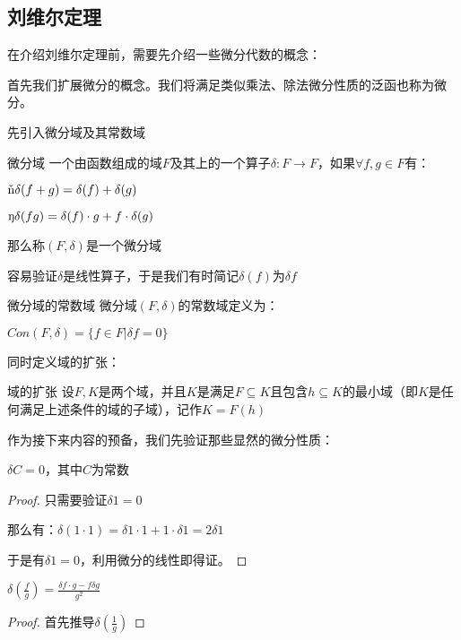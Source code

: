 \documentclass[12pt, a4paper, oneside, UTF8]{ctexbook}
\begin{document}
		\subsection{刘维尔定理}
			在介绍刘维尔定理前，需要先介绍一些微分代数的概念：
			
			首先我们扩展微分的概念。我们将满足类似乘法、除法微分性质的泛函也称为微分。
			
			先引入微分域及其常数域
			\begin{para}{0}
					\begin{defn}{微分域}{}
						一个由函数组成的域$F$及其上的一个算子$\delta:F \rightarrow F$，如果$\forall f,g \in F$有：
						
						$\ding{172} \delta(f+g) = \delta(f)+\delta(g)$
						
						$\ding{173} \delta(fg) = \delta(f)\cdot g+f \cdot \delta(g)$
						
						那么称$(F,\delta)$是一个微分域
					\end{defn}
					容易验证$\delta$是线性算子，于是我们有时简记$\delta(f)$为$\delta f$
					\begin{defn}{微分域的常数域}{}
						微分域$(F,\delta)$的常数域定义为：
						
						$Con (F,\delta) =\{f \in F| \delta f = 0\}$
					\end{defn}
					同时定义域的扩张：
					\begin{defn}{域的扩张}{}
						设$F,K$是两个域，并且$K$是满足$F \subseteq K$且包含$h \subseteq K$的最小域（即$K$是任何满足上述条件的域的子域），记作$K = F(h)$
					\end{defn}
					作为接下来内容的预备，我们先验证那些显然的微分性质：
					\begin{proposition}
						$\delta C = 0$，其中$C$为常数 
					\end{proposition}
					\begin{proof}
						只需要验证$\delta 1 = 0$
						
						那么有：$\delta (1\cdot 1) = \delta 1 \cdot 1 + 1 \cdot \delta 1=2\delta 1$
						
						于是有$\delta 1 = 0$，利用微分的线性即得证。
					\end{proof}
					\begin{proposition}
						$\delta \left(\frac{f}{g}\right)=\frac{\delta f \cdot g - f \delta g}{g^2}$
					\end{proposition}
					\begin{proof}
						首先推导$\delta \left(\frac{1}{g}\right)$
						

\end{proof}
\end{para}
\end{document}
